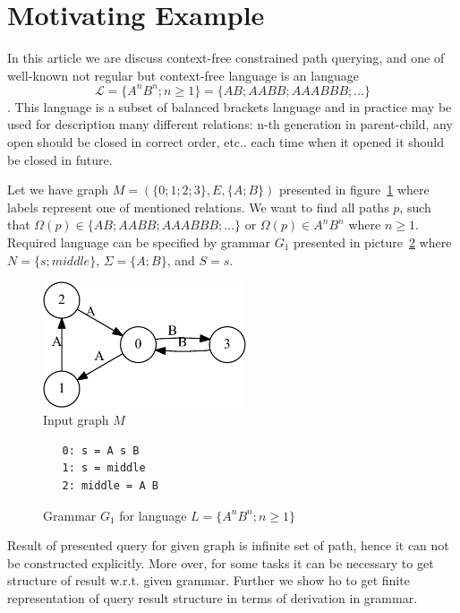 \section{Motivating Example}

In this article we are discuss context-free constrained path querying, and one of well-known not regular but context-free language is an 
language $$\mathcal{L} = \{A^n B^n; n \geq 1\} = \{AB; AABB; AAABBB; \dots\}$$.
This language is a subset of balanced brackets language and in practice may be used for description many different relations: n-th generation in parent-child, any open should be closed in correct order, etc.. 
each time when it opened it should be closed in future.

Let we have graph $M=(\{0;1;2;3\},E,\{A;B\})$ presented in figure~\ref{input} where labels represent one of mentioned relations.
We want to find all paths $p$, such that $\Omega(p) \in \{AB; AABB; AAABBB; \dots\}$ or $\Omega(p) \in A^n B^n$ where $n \geq 1$.
Required language can be specified by grammar $G_1$ presented in picture~\ref{grammarG} where $N = \{s; middle\}$, $\Sigma = \{A; B\}$, and $S = s$.

\begin{figure}[h]
    \begin{center}
        \includegraphics[width=6cm]{dot/input.pdf}
        \caption{Input graph $M$}
        \label{input}        
    \end{center}
\end{figure}

\begin{figure}[h]
   \begin{center}
\begin{verbatim}
   0: s = A s B 
   1: s = middle
   2: middle = A B
\end{verbatim}
   \caption{Grammar $G_1$ for language $L=\{A^n B^n; n \geq 1\}$}
   \label{grammarG}        
   \end{center}
\end{figure}

Result of presented query for given graph is infinite set of path, hence it can not be constructed explicitly. 
More over, for some tasks it can be necessary to get structure of result w.r.t. given grammar.
Further we show ho to get finite representation of query result structure in terms of derivation in grammar.
